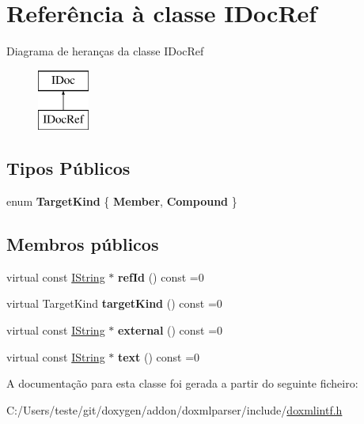 \hypertarget{class_i_doc_ref}{\section{Referência à classe I\-Doc\-Ref}
\label{class_i_doc_ref}
}
Diagrama de heranças da classe I\-Doc\-Ref\begin{figure}[H]
\begin{center}
\leavevmode
\includegraphics[height=2.000000cm]{class_i_doc_ref}
\end{center}
\end{figure}
\subsection*{Tipos Públicos}
\begin{DoxyCompactItemize}
\item 
enum {\bfseries Target\-Kind} \{ {\bfseries Member}, 
{\bfseries Compound}
 \}
\end{DoxyCompactItemize}
\subsection*{Membros públicos}
\begin{DoxyCompactItemize}
\item 
\hypertarget{class_i_doc_ref_a60f519e58362b0fc9165a31c906379e6}{virtual const \hyperlink{class_i_string}{I\-String} $\ast$ {\bfseries ref\-Id} () const =0}\label{class_i_doc_ref_a60f519e58362b0fc9165a31c906379e6}

\item 
\hypertarget{class_i_doc_ref_a314ccf3219b104bf5e61b8387f936ab2}{virtual Target\-Kind {\bfseries target\-Kind} () const =0}\label{class_i_doc_ref_a314ccf3219b104bf5e61b8387f936ab2}

\item 
\hypertarget{class_i_doc_ref_ae2c03b2601e3685813ab583bd9bf1057}{virtual const \hyperlink{class_i_string}{I\-String} $\ast$ {\bfseries external} () const =0}\label{class_i_doc_ref_ae2c03b2601e3685813ab583bd9bf1057}

\item 
\hypertarget{class_i_doc_ref_aa487ae4b2bd6e3e7975ff2efe2666148}{virtual const \hyperlink{class_i_string}{I\-String} $\ast$ {\bfseries text} () const =0}\label{class_i_doc_ref_aa487ae4b2bd6e3e7975ff2efe2666148}

\end{DoxyCompactItemize}


A documentação para esta classe foi gerada a partir do seguinte ficheiro\-:\begin{DoxyCompactItemize}
\item 
C\-:/\-Users/teste/git/doxygen/addon/doxmlparser/include/\hyperlink{include_2doxmlintf_8h}{doxmlintf.\-h}\end{DoxyCompactItemize}
